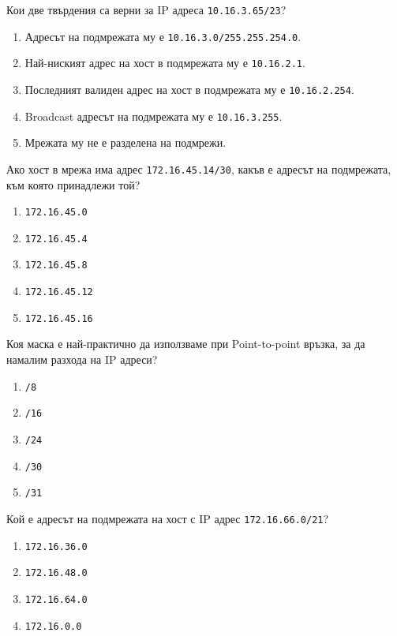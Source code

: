 \begin{q}
  Кои две твърдения са верни за IP адреса \texttt{10.16.3.65/23}?
  \begin{enumerate}
  \item Адресът на подмрежата му е \texttt{10.16.3.0/255.255.254.0}.
  \item Най-ниският адрес на хост в подмрежата му е \texttt{10.16.2.1}.
  \item Последният валиден адрес на хост в подмрежата му е \texttt{10.16.2.254}.
  \item Broadcast адресът на подмрежата му е \texttt{10.16.3.255}.
  \item Мрежата му не е разделена на подмрежи.
  \end{enumerate}
\end{q}

\begin{q}
  Ако хост в мрежа има адрес \texttt{172.16.45.14/30}, какъв е адресът на
  подмрежата, към която принадлежи той?
  \begin{enumerate}
  \item \texttt{172.16.45.0}
  \item \texttt{172.16.45.4}
  \item \texttt{172.16.45.8}
  \item \texttt{172.16.45.12}
  \item \texttt{172.16.45.16}
  \end{enumerate}
\end{q}

\begin{q}
  Коя маска е най-практично да използваме при Point-to-point връзка, за да
  намалим разхода на IP адреси?
  \begin{enumerate}
  \item \texttt{/8}
  \item \texttt{/16}
  \item \texttt{/24}
  \item \texttt{/30}
  \item \texttt{/31}
  \end{enumerate}
\end{q}

\begin{q}
  Кой е адресът на подмрежата на хост с IP адрес \texttt{172.16.66.0/21}?
  \begin{enumerate}
  \item \texttt{172.16.36.0}
  \item \texttt{172.16.48.0}
  \item \texttt{172.16.64.0}
  \item \texttt{172.16.0.0}
  \end{enumerate}
\end{q}

